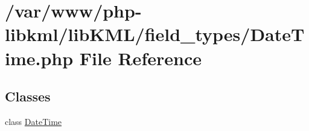 \hypertarget{DateTime_8php}{
\section{/var/www/php-\/libkml/libKML/field\_\-types/DateTime.php File Reference}
\label{da/dd9/DateTime_8php}
}
\subsection*{Classes}
\begin{DoxyCompactItemize}
\item 
class \hyperlink{classDateTime}{DateTime}
\end{DoxyCompactItemize}
